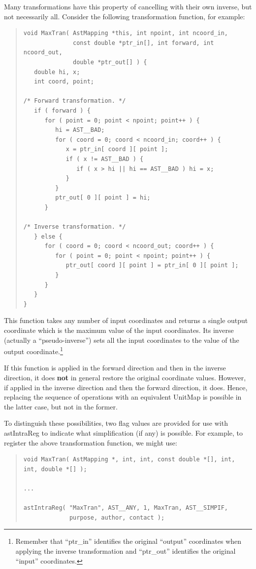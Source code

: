 \documentclass[twoside,11pt]{article}
\newcommand{\htmlref}[2]{#1}
\begin{document}
Many transformations have this property of cancelling with their own
inverse, but not necessarily all. Consider the following
transformation function, for example:

\begin{quote}
\small
\begin{verbatim}
void MaxTran( AstMapping *this, int npoint, int ncoord_in,
              const double *ptr_in[], int forward, int ncoord_out,
              double *ptr_out[] ) {
   double hi, x;
   int coord, point;

/* Forward transformation. */
   if ( forward ) {
      for ( point = 0; point < npoint; point++ ) {
         hi = AST__BAD;
         for ( coord = 0; coord < ncoord_in; coord++ ) {
            x = ptr_in[ coord ][ point ];
            if ( x != AST__BAD ) {
               if ( x > hi || hi == AST__BAD ) hi = x;
            }
         }
         ptr_out[ 0 ][ point ] = hi;
      }

/* Inverse transformation. */
   } else {
      for ( coord = 0; coord < ncoord_out; coord++ ) {
         for ( point = 0; point < npoint; point++ ) {
            ptr_out[ coord ][ point ] = ptr_in[ 0 ][ point ];
         }
      }      
   }
}
\end{verbatim}
\normalsize
\end{quote}

This function takes any number of input coordinates and returns a
single output coordinate which is the maximum value of the input
coordinates. Its inverse (actually a ``pseudo-inverse'') sets all the
input coordinates to the value of the output
coordinate.\footnote{Remember that ``ptr\_in'' identifies the original
``output'' coordinates when applying the inverse transformation and
``ptr\_out'' identifies the original ``input'' coordinates.}

If this function is applied in the forward direction and then in the
inverse direction, it does {\bf{not}} in general restore the original
coordinate values. However, if applied in the inverse direction and
then the forward direction, it does. Hence, replacing the sequence of
operations with an equivalent UnitMap is possible in the latter case,
but not in the former.

To distinguish these possibilities, two flag values are provided for
use with \htmlref{astIntraReg}{astIntraReg} to indicate what simplification (if any) is
possible. For example, to register the above transformation function,
we might use:

\begin{quote}
\small
\begin{verbatim}
void MaxTran( AstMapping *, int, int, const double *[], int, int, double *[] );

...

astIntraReg( "MaxTran", AST__ANY, 1, MaxTran, AST__SIMPIF,
             purpose, author, contact );
\end{verbatim}
\normalsize
\end{quote}
\end{document}

